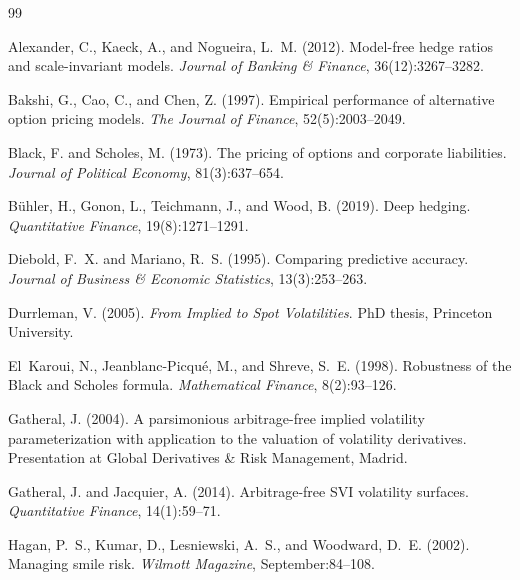 \documentclass[12pt, letterpaper]{article}
\begin{document}
\begin{thebibliography}{99}

Alexander, C., Kaeck, A., and Nogueira, L.~M. (2012).
\newblock Model-free hedge ratios and scale-invariant models.
\newblock \textit{Journal of Banking \& Finance}, 36(12):3267--3282.

Bakshi, G., Cao, C., and Chen, Z. (1997).
\newblock Empirical performance of alternative option pricing models.
\newblock \textit{The Journal of Finance}, 52(5):2003--2049.

Black, F. and Scholes, M. (1973).
\newblock The pricing of options and corporate liabilities.
\newblock \textit{Journal of Political Economy}, 81(3):637--654.

B{\"u}hler, H., Gonon, L., Teichmann, J., and Wood, B. (2019).
\newblock Deep hedging.
\newblock \textit{Quantitative Finance}, 19(8):1271--1291.

Diebold, F.~X. and Mariano, R.~S. (1995).
\newblock Comparing predictive accuracy.
\newblock \textit{Journal of Business \& Economic Statistics}, 13(3):253--263.

Durrleman, V. (2005).
\newblock \textit{From Implied to Spot Volatilities}.
\newblock PhD thesis, Princeton University.

El~Karoui, N., Jeanblanc-Picqu{\'e}, M., and Shreve, S.~E. (1998).
\newblock Robustness of the {Black} and {Scholes} formula.
\newblock \textit{Mathematical Finance}, 8(2):93--126.

Gatheral, J. (2004).
\newblock A parsimonious arbitrage-free implied volatility parameterization with application to the valuation of volatility derivatives.
\newblock Presentation at Global Derivatives \& Risk Management, Madrid.

Gatheral, J. and Jacquier, A. (2014).
\newblock Arbitrage-free {SVI} volatility surfaces.
\newblock \textit{Quantitative Finance}, 14(1):59--71.

Hagan, P.~S., Kumar, D., Lesniewski, A.~S., and Woodward, D.~E. (2002).
\newblock Managing smile risk.
\newblock \textit{Wilmott Magazine}, September:84--108.


\end{thebibliography}
\end{document}
